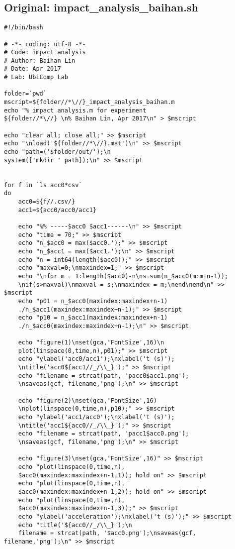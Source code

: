 \documentclass{sigchi}
\begin{document}
\subsection{Original: impact\_analysis\_baihan.sh}\label{ss:ipc_ana.sh}
\begin{lstlisting}
#!/bin/bash

# -*- coding: utf-8 -*-
# Code: impact analysis
# Author: Baihan Lin
# Date: Apr 2017
# Lab: UbiComp Lab

folder=`pwd`
mscript=${folder//*\//}_impact_analysis_baihan.m
echo "% impact analysis.m for experiment 
${folder//*\//} \n% Baihan Lin, Apr 2017\n" > $mscript

echo "clear all; close all;" >> $mscript
echo "\nload('${folder//*\//}.mat')\n" >> $mscript
echo "path=('$folder/out/');\n
system(['mkdir ' path]);\n" >> $mscript


for f in `ls acc0*csv`
do
    acc0=${f//.csv/}
    acc1=${acc0/acc0/acc1}

	echo "%% -----$acc0 $acc1------\n" >> $mscript
	echo "time = 70;" >> $mscript
    echo "n_$acc0 = max($acc0.');" >> $mscript
    echo "n_$acc1 = max($acc1.');\n" >> $mscript
    echo "n = int64(length($acc0));" >> $mscript
    echo "maxval=0;\nmaxindex=1;" >> $mscript
    echo "\nfor m = 1:length($acc0)-n\ns=sum(n_$acc0(m:m+n-1));
    \nif(s>maxval)\nmaxval = s;\nmaxindex = m;\nend\nend\n" >> $mscript
    echo "p01 = n_$acc0(maxindex:maxindex+n-1)
    ./n_$acc1(maxindex:maxindex+n-1);" >> $mscript
    echo "p10 = n_$acc1(maxindex:maxindex+n-1)
    ./n_$acc0(maxindex:maxindex+n-1);\n" >> $mscript

	echo "figure(1)\nset(gca,'FontSize',16)\n
    plot(linspace(0,time,n),p01);" >> $mscript
	echo "ylabel('acc0/acc1');\nxlabel('t (s)');
    \ntitle('acc0${acc1//_/\\_}');" >> $mscript
	echo "filename = strcat(path, 'pacc0$acc1.png');
    \nsaveas(gcf, filename,'png');\n" >> $mscript

	echo "figure(2)\nset(gca,'FontSize',16)
    \nplot(linspace(0,time,n),p10);" >> $mscript
	echo "ylabel('acc1/acc0');\nxlabel('t (s)');
    \ntitle('acc1${acc0//_/\\_}');" >> $mscript
	echo "filename = strcat(path, 'pacc1$acc0.png');
    \nsaveas(gcf, filename,'png');\n" >> $mscript

	echo "figure(3)\nset(gca,'FontSize',16)" >> $mscript
	echo "plot(linspace(0,time,n),
    $acc0(maxindex:maxindex+n-1,1)); hold on" >> $mscript
	echo "plot(linspace(0,time,n),
    $acc0(maxindex:maxindex+n-1,2)); hold on" >> $mscript
	echo "plot(linspace(0,time,n),
    $acc0(maxindex:maxindex+n-1,3));" >> $mscript
	echo "ylabel('acceleration');\nxlabel('t (s)');" >> $mscript
	echo "title('${acc0//_/\\_}');\n
    filename = strcat(path, '$acc0.png');\nsaveas(gcf, filename,'png');\n" >> $mscript


\end{lstlisting}
\end{document}
